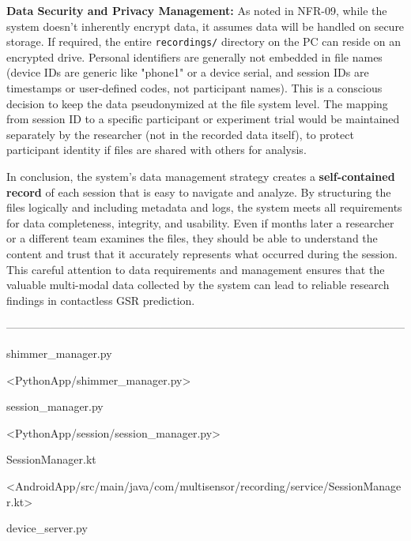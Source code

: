 \textbf{Data Security and Privacy Management:} As noted in NFR-09, while the
system doesn't inherently encrypt data, it assumes data will be handled
on secure storage. If required, the entire \texttt{recordings/} directory on
the PC can reside on an encrypted drive. Personal identifiers are
generally not embedded in file names (device IDs are generic like
"phone1" or a device serial, and session IDs are timestamps or
user-defined codes, not participant names). This is a conscious decision
to keep the data pseudonymized at the file system level. The mapping
from session ID to a specific participant or experiment trial would be
maintained separately by the researcher (not in the recorded data
itself), to protect participant identity if files are shared with others
for analysis.

In conclusion, the system's data management strategy creates a
\textbf{self-contained record} of each session that is easy to navigate and
analyze. By structuring the files logically and including metadata and
logs, the system meets all requirements for data completeness,
integrity, and usability. Even if months later a researcher or a
different team examines the files, they should be able to understand the
content and trust that it accurately represents what occurred during the
session. This careful attention to data requirements and management
ensures that the valuable multi-modal data collected by the system can
lead to reliable research findings in contactless GSR prediction.

------------------------------------------------------------------------------------------------------------

\cite{ref1}
\cite{ref2}
\cite{ref12}
\cite{ref13}
\cite{ref22}
\cite{ref23}
\cite{ref24}
\cite{ref33}
\cite{ref34}
\cite{ref43}
shimmer_manager.py

<PythonApp/shimmer_manager.py>

\cite{ref3}
\cite{ref11}
\cite{ref21}
\cite{ref58}
\cite{ref59}
\cite{ref60}
\cite{ref61}
\cite{ref67}
\cite{ref68}
session_manager.py

<PythonApp/session/session_manager.py>

\cite{ref4}
\cite{ref8}
\cite{ref9}
\cite{ref10}
\cite{ref25}
\cite{ref26}
\cite{ref27}
\cite{ref28}
\cite{ref62}
\cite{ref65}
\cite{ref69}
\cite{ref70}
\cite{ref71}
SessionManager.kt

<AndroidApp/src/main/java/com/multisensor/recording/service/SessionManager.kt>

\cite{ref5}
\cite{ref6}
\cite{ref7}
\cite{ref14}
\cite{ref15}
\cite{ref18}
\cite{ref19}
\cite{ref20}
\cite{ref29}
\cite{ref30}
\cite{ref31}
\cite{ref32}
\cite{ref35}
\cite{ref38}
\cite{ref39}
\cite{ref40}
\cite{ref46}
\cite{ref47}
\cite{ref48}
\cite{ref49}
\cite{ref50}
\cite{ref51}
\cite{ref52}
\cite{ref53}
\cite{ref54}
\cite{ref55}
\cite{ref56}
\cite{ref57}
device_server.py

